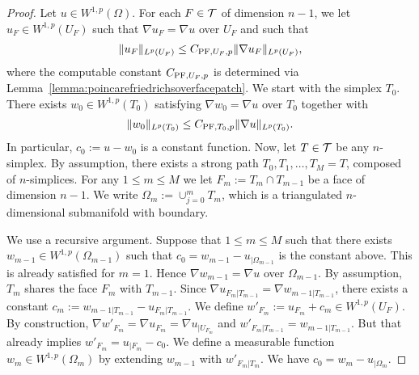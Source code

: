 \documentclass[10pt,letterpaper]{article}
\newcommand{\notice}[1]{\textcolor{red}{REMARK: #1}}
\begin{document}
\begin{proof}
 Let $u \in W^{1,p}(\Omega)$. 
 For each $F \in {\mathcal T}$ of dimension $n-1$, 
 we let $u_F \in W^{1,p}(U_F)$ such that $\nabla u_F = \nabla u$ over $U_F$ and such that 
 \begin{align*}
    \| u_F \|_{L^{p}(U_F)} \leq C_{{\rm{PF}},U_F,p} \| \nabla u_F \|_{L^{p}(U_F)},
 \end{align*}
 where the computable constant $C_{{\rm{PF}},U_F,p}$ is determined via Lemma~\ref{lemma:poincarefriedrichsoverfacepatch}.
 We start with the simplex $T_{0}$. 
 There exists $w_0 \in W^{1,p}(T_{0})$ satisfying $\nabla w_0 = \nabla u$ over $T_{0}$ together with 
 \begin{gather*}
    \| w_0 \|_{L^{p}(T_{0})} \leq C_{{\rm{PF}},T_{0},p} \| \nabla u \|_{L^{p}(T_{0})}.
 \end{gather*}
 In particular, $c_{0} := u - w_0$ is a constant function. 
 Now, let $T \in {\mathcal T}$ be any $n$-simplex. 
 By assumption, there exists a strong path $T_0, T_1, \dots, T_M = T$, composed of $n$-simplices. 
 For any $1 \leq m \leq M$ we let $F_m := T_m \cap T_{m-1}$ be a face of dimension $n-1$. 
 We write $\Omega_m := \cup_{j=0}^{m} T_m$, which is a triangulated $n$-dimensional submanifold with boundary.
 
 
 
 We use a recursive argument. 
 Suppose that $1 \leq m \leq M$ such that there exists $w_{m-1} \in W^{1,p}(\Omega_{m-1})$ 
 such that $c_{0} = w_{m-1} - u_{|\Omega_{m-1}}$ is the constant above. 
 This is already satisfied for $m=1$.
 Hence $\nabla w_{m-1} = \nabla u$ over $\Omega_{m-1}$. 
 By assumption, $T_{m}$ shares the face $F_{m}$ with $T_{{m-1}}$. 
 Since $\nabla u_{F_{m}|T_{{m-1}}} = \nabla w_{m-1|T_{{m-1}}}$,
 there exists a constant $c_{m} := w_{m-1|T_{{m-1}}} - u_{F_{m}|T_{{m-1}}}$.
 We define $w'_{F_m} := u_{F_m} + c_{m} \in W^{1,p}(U_F)$.
 By construction, $\nabla w'_{F_m} = \nabla u_{F_m} = \nabla u_{|U_{F_m}}$ 
 and 
 $w'_{F_{m}|T_{{m-1}}} = w_{m-1|T_{{m-1}}}$. 
 But that already implies $w'_{F_m} = u_{|F_m} - c_{0}$. 
 We define a measurable function $w_{m} \in W^{1,p}(\Omega_m)$ by extending $w_{m-1}$ with $w'_{F_m|T_m}$.
 We have $c_{0} = w_{m} - u_{|\Omega_{m}}$. 
 

\end{proof}
\end{document}
